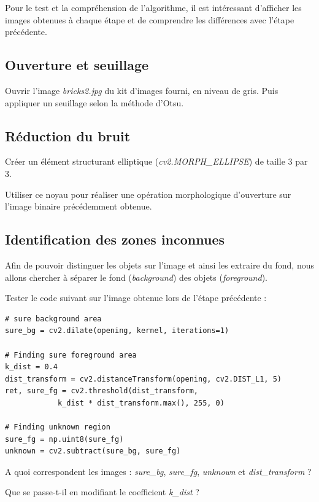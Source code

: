 \documentclass[a4paper,11pt,titlepage]{article} %
\begin{document}
Pour le test et la compréhension de l'algorithme, il est intéressant d'afficher les images obtenues à chaque étape et de comprendre les différences avec l'étape précédente.
	
\subsection{Ouverture et seuillage}

\Manip Ouvrir l'image \textsl{bricks2.jpg} du kit d'images fourni, en niveau de gris. Puis appliquer un seuillage selon la méthode d'Otsu.

\subsection{Réduction du bruit}

\Manip Créer un élément structurant elliptique (\textsl{cv2.MORPH\_ELLIPSE}) de taille 3 par 3.

\Manip Utiliser ce noyau pour réaliser une opération morphologique d'ouverture sur l'image binaire précédemment obtenue. 

\subsection{Identification des zones inconnues}

Afin de pouvoir distinguer les objets sur l'image et ainsi les extraire du fond, nous allons chercher à séparer le fond (\textit{background}) des objets (\textit{foreground}).

\Manip Tester le code suivant sur l'image obtenue lors de l'étape précédente :

\begin{lstlisting}
# sure background area
sure_bg = cv2.dilate(opening, kernel, iterations=1)

# Finding sure foreground area
k_dist = 0.4
dist_transform = cv2.distanceTransform(opening, cv2.DIST_L1, 5)
ret, sure_fg = cv2.threshold(dist_transform, 
			k_dist * dist_transform.max(), 255, 0)

# Finding unknown region
sure_fg = np.uint8(sure_fg)
unknown = cv2.subtract(sure_bg, sure_fg)
\end{lstlisting}

\Quest A quoi correspondent les images : \textsl{sure\_bg}, \textsl{sure\_fg}, \textsl{unknown} et \textsl{dist\_transform} ?

\Quest Que se passe-t-il en modifiant le coefficient \textsl{k\_dist} ?
\end{document}
